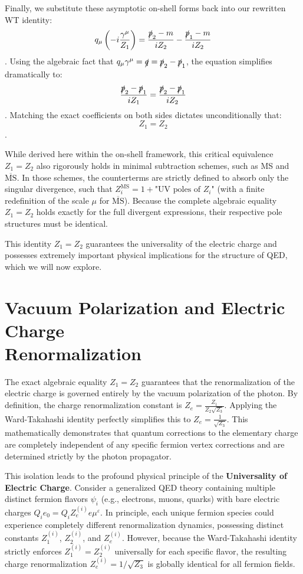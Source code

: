 Finally, we substitute these asymptotic on-shell forms back into our rewritten WT identity:
\[ q_\mu \left( -i \frac{\gamma^\mu}{Z_1} \right) = \frac{\slashed{p}_2 - m}{i Z_2} - \frac{\slashed{p}_1 - m}{i Z_2} \].
Using the algebraic fact that $q_\mu \gamma^\mu = \slashed{q} = \slashed{p}_2 - \slashed{p}_1$, the equation simplifies dramatically to:
\[ \frac{\slashed{p}_2 - \slashed{p}_1}{i Z_1} = \frac{\slashed{p}_2 - \slashed{p}_1}{i Z_2} \].
Matching the exact coefficients on both sides dictates unconditionally that:
\[ Z_1 = Z_2 \].

While derived here within the on-shell framework, this critical equivalence $Z_1 = Z_2$ also rigorously holds in minimal subtraction schemes, such as MS and $\overline{\text{MS}}$. In those schemes, the counterterms are strictly defined to absorb only the singular divergence, such that $Z_i^{\text{MS}} = 1 + \text{"UV poles of } Z_i\text{"}$ (with a finite redefinition of the scale $\mu$ for $\overline{\text{MS}}$). Because the complete algebraic equality $Z_1 = Z_2$ holds exactly for the full divergent expressions, their respective pole structures must be identical.

This identity $Z_1 = Z_2$ guarantees the universality of the electric charge and possesses extremely important physical implications for the structure of QED, which we will now explore.

\section[Vacuum Polarization and Electric Charge Renormalization]{Vacuum Polarization and Electric Charge\\Renormalization}

The exact algebraic equality $Z_1 = Z_2$ guarantees that the renormalization of the electric charge is governed entirely by the vacuum polarization of the photon. By definition, the charge renormalization constant is $Z_e = \frac{Z_1}{Z_2 \sqrt{Z_3}}$. Applying the Ward-Takahashi identity perfectly simplifies this to $Z_e = \frac{1}{\sqrt{Z_3}}$. This mathematically demonstrates that quantum corrections to the elementary charge are completely independent of any specific fermion vertex corrections and are determined strictly by the photon propagator.

This isolation leads to the profound physical principle of the \textbf{Universality of Electric Charge}. Consider a generalized QED theory containing multiple distinct fermion flavors $\psi_i$ (e.g., electrons, muons, quarks) with bare electric charges $Q_i e_0 = Q_i Z_e^{(i)} e \mu^\varepsilon$. In principle, each unique fermion species could experience completely different renormalization dynamics, possessing distinct constants $Z_1^{(i)}$, $Z_2^{(i)}$, and $Z_e^{(i)}$. However, because the Ward-Takahashi identity strictly enforces $Z_1^{(i)} = Z_2^{(i)}$ universally for each specific flavor, the resulting charge renormalization $Z_e^{(i)} = 1/\sqrt{Z_3}$ is globally identical for all fermion fields.

